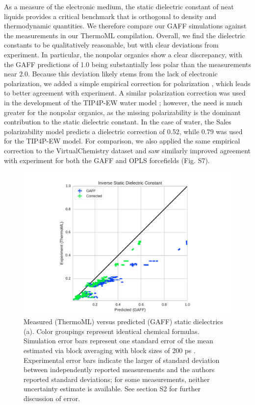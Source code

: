\documentclass[journal=jacsat,manuscript=article]{achemso}
\begin{document}
As a measure of the electronic medium, the static dielectric constant of neat liquids provides a critical benchmark that is orthogonal to density and thermodynamic quantities.  We therefore compare our GAFF simulations against the measurements in our ThermoML compilation.  Overall, we find the dielectric constants to be qualitatively reasonable, but with clear deviations from experiment.  In particular, the nonpolar organics show a clear discrepancy, with the GAFF predictions of 1.0 being substantially less polar than the measurements near 2.0.  Because this deviation likely stems from the lack of electronic polarization, we added a simple empirical correction for polarization \cite{bosque2002polarizabilities}, which leads to better agreement with experiment.  A similar polarization correction was used in the development of the TIP4P-EW water model \cite{horn2004}; however, the need is much greater for the nonpolar organics, as the missing polarizability is the dominant contribution to the static dielectric constant.  In the case of water, the Sales polarizability model predicts a dielectric correction of 0.52, while 0.79 was used for the TIP4P-EW model.  For comparison, we also applied the same empirical correction to the VirtualChemistry dataset \cite{caleman2011force, van2012gromacs} and saw similarly improved agreement with experiment for both the GAFF and OPLS forcefields (Fig. S7).

\begin{figure}
\includegraphics[width=\columnwidth]{./figures/dielectrics_thermoml.pdf}

\caption{Measured (ThermoML) versus predicted (GAFF) static dielectrics (a).  Color groupings represent identical chemical formulas.  Simulation error bars represent one standard error of the mean estimated via block averaging with block sizes of 200 ps \cite{flyvbjerg1989error}.  Experimental error bars indicate the larger of standard deviation between independently reported measurements and the authors reported standard deviations; for some measurements, neither uncertainty estimate is available.  See section S2 for further discussion of error.
}
\label{figure:Dielectric}
\end{figure}
\end{document}

